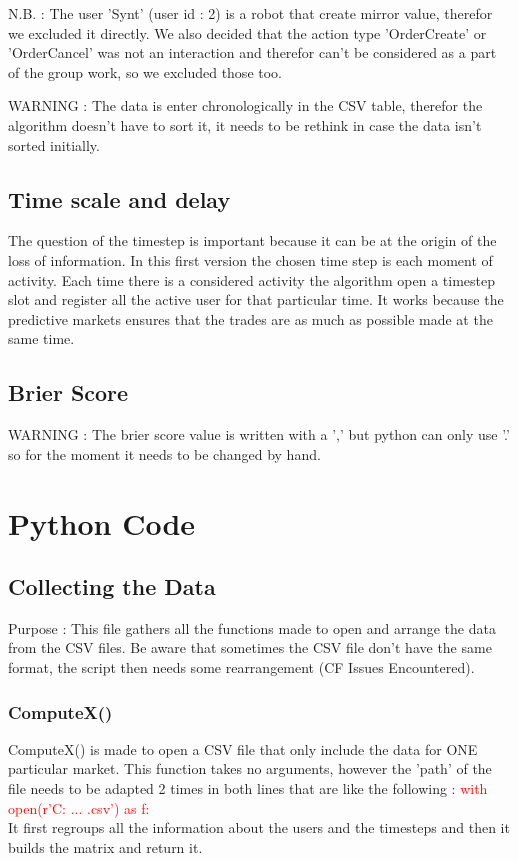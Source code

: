 \documentclass{report}
\begin{document}
N.B. : The user 'Synt' (user id : 2) is a robot that create mirror value, therefor we excluded it directly. We also decided that the action type 'OrderCreate' or 'OrderCancel' was not an interaction and therefor can't be considered as a part of the group work, so we excluded those too.

WARNING : The data is enter chronologically in the CSV table, therefor the algorithm doesn't have to sort it, it needs to be rethink in case the data isn't sorted initially. 

\section{Time scale and delay}

The question of the timestep is important because it can be at the origin of the loss of information. In this first version the chosen time step is each moment of activity. Each time there is a considered activity the algorithm open a timestep slot and register all the active user for that particular time. It works because the predictive markets ensures that the trades are as much as possible made at the same time.

\section{Brier Score}

WARNING : The brier score value is written with a ',' but python can only use '.' so for the moment it needs to be changed by hand.

\chapter{Python Code}
\section{Collecting the Data}

Purpose : This file gathers all the functions made to open and arrange the data from the CSV files. Be aware that sometimes the CSV file don't have the same format, the script then needs some rearrangement (CF Issues Encountered).

\subsection{ComputeX()}

ComputeX() is made to open a CSV file that only include the data for ONE particular market. This function takes no arguments, however the 'path' of the file needs to be adapted 2 times in both lines that are like the following : \textcolor{red}{with open(r'C: ... .csv') as f:}\\
It first regroups all the information about the users and the timesteps and then it builds the matrix and return it.\\
\end{document}
